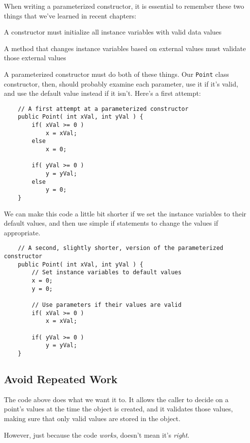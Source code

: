 When writing a parameterized constructor, it is essential to remember these two things that we've learned in recent chapters:

\bi
\item A constructor must initialize all instance variables with valid data values
\item A method that changes instance variables based on external values must validate those external values
\ei

A parameterized constructor must do both of these things.  Our \texttt{Point} class constructor, then, should probably examine each parameter, use it if it's valid, and use the default value instead if it isn't.  Here's a first attempt:

\begin{verbatim}
    // A first attempt at a parameterized constructor
    public Point( int xVal, int yVal ) {
        if( xVal >= 0 )
            x = xVal;
        else
            x = 0;

        if( yVal >= 0 )
            y = yVal;
        else
            y = 0;
    }
\end{verbatim}

We can make this code a little bit shorter if we set the instance variables to their default values, and then use simple if statements to change the values if appropriate.

\begin{verbatim}
    // A second, slightly shorter, version of the parameterized constructor
    public Point( int xVal, int yVal ) {
        // Set instance variables to default values
        x = 0;
        y = 0;

        // Use parameters if their values are valid
        if( xVal >= 0 )
            x = xVal;

        if( yVal >= 0 )
            y = yVal;
    }
\end{verbatim}

\subsection{Avoid Repeated Work}

The code above does what we want it to.  It allows the caller to decide on a point's values at the time the object is created, and it validates those values, making sure that only valid values are stored in the object.

However, just because the code \textit{works}, doesn't mean it's \textit{right}.

